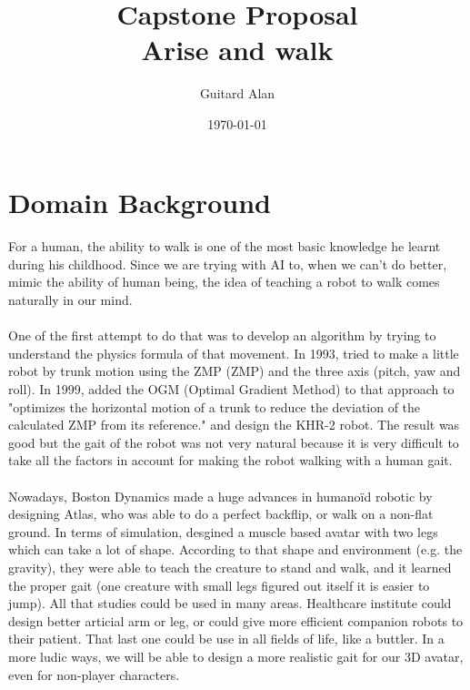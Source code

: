 \documentclass{article}
\title{\textbf{Capstone Proposal}\\Arise and walk}
\date{\today}
\author{Guitard Alan}
\begin{document}
\raggedright
	\maketitle	
	\section{Domain Background}
  \paragraph{}
  For a human, the ability to walk is one of the most basic knowledge he learnt
  during his childhood. Since we are trying with AI to, when we can't do better,
  mimic the ability of human being, the idea of teaching a robot to walk comes
  naturally in our mind.
  \paragraph{}
  One of the first attempt to do that was to develop an algorithm by trying to
  understand the physics formula of that movement. In 1993,
  \citet{1993-TrunkMotion} tried to make a little robot by trunk motion
  using the ZMP (\gls{ZMP}) and the three
  axis (pitch, yaw and roll)\cite{1993-TrunkMotion}. In 1999, \citeauthor{1999-KHR-2}
  added the OGM (Optimal Gradient Method) to that approach
  to "optimizes the horizontal motion of a trunk to reduce the
  deviation of the calculated ZMP from its
  reference." \cite{1999-KHR-2} and design the KHR-2 robot.
  The result was good but the gait of the robot was not very natural because
  it is very difficult to take all the factors in account for making
  the robot walking with a human gait.
  \paragraph{}
  Nowadays, Boston Dynamics made a huge advances in humanoïd robotic by
  designing Atlas\cite{doi:10.1002/rob.21559}, who was able to do a perfect backflip, or walk on a non-flat
  ground. In terms of simulation, \citeauthor{2013-TOG-MuscleBasedBipeds}
  desgined a muscle based avatar with two legs which can take a lot of shape.
  According to that shape and environment (e.g. the gravity), they were able to
  teach the creature to stand and walk, and it learned the proper gait (one
  creature with small legs figured out itself it is easier to
  jump).\cite{2013-TOG-MuscleBasedBipeds}
  All that studies could be used in many areas. Healthcare institute could
  design better articial arm or leg, or could give more efficient companion
  robots to their patient. That last one could be use in all fields of life,
  like a buttler. In a more ludic ways, we will be able to design a more
  realistic gait for our 3D avatar, even for non-player characters. 
  
\end{document}
